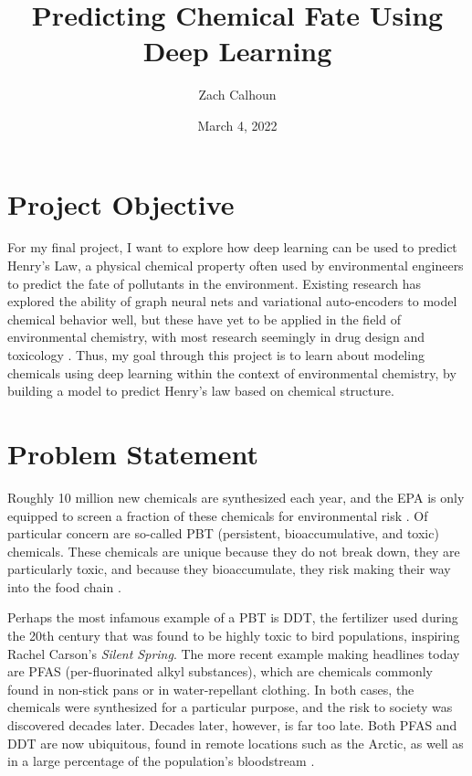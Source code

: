 \documentclass[12pt, oneside]{article}   	%
\title{Predicting Chemical Fate Using Deep Learning}
\author{Zach Calhoun}
\date{March 4, 2022}
\begin{document}
\maketitle

\section{Project Objective}
For my final project, I want to explore how deep learning can be used to predict Henry's Law, a physical chemical property often used by environmental engineers to predict the fate of pollutants in the environment. Existing research has explored the ability of graph neural nets and variational auto-encoders to model chemical behavior well, but these have yet to be applied in the field of environmental chemistry, with most research seemingly in drug design and toxicology \cite{RN106}. Thus, my goal through this project is to learn about modeling chemicals using deep learning within the context of environmental chemistry, by building a model to predict Henry's law based on chemical structure.

\section{Problem Statement}
Roughly 10 million new chemicals are synthesized each year, and the EPA is only equipped to screen a fraction of these chemicals for environmental risk \cite{burton}. Of particular concern are so-called PBT (persistent, bioaccumulative, and toxic) chemicals. These chemicals are unique because they do not break down, they are particularly toxic, and because they bioaccumulate, they risk making their way into the food chain \cite{matthies}.

Perhaps the most infamous example of a PBT is DDT, the fertilizer used during the 20th century that was found to be highly toxic to bird populations, inspiring Rachel Carson's \emph{Silent Spring}. The more recent example making headlines today are PFAS (per-fluorinated alkyl substances), which are chemicals commonly found in non-stick pans or in water-repellant clothing. In both cases, the chemicals were synthesized for a particular purpose, and the risk to society was discovered decades later. Decades later, however, is far too late. Both PFAS and DDT are now ubiquitous, found in remote locations such as the Arctic, as well as in a large percentage of the population's bloodstream \cite{czub}.
\end{document}
